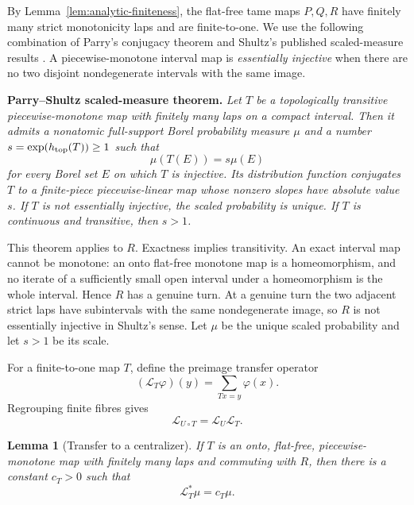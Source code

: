 \documentclass[11pt]{article}
\newtheorem{lemma}[theorem]{Lemma}
\theoremstyle{definition}
\theoremstyle{remark}
\begin{document}
By Lemma~\ref{lem:analytic-finiteness}, the flat-free tame maps
\(P,Q,R\) have finitely many strict monotonicity laps and are finite-to-one.
We use the following combination of Parry's conjugacy theorem
\cite{Parry} and Shultz's published scaled-measure results
\cite[Corollaries 4.4 and 4.6 and Proposition 3.6]{Shultz}.  A
piecewise-monotone interval map is
\emph{essentially injective} when there are no two disjoint nondegenerate
intervals with the same image.

\medskip
\noindent\textbf{Parry--Shultz scaled-measure theorem.}
\emph{Let $T$ be a topologically transitive piecewise-monotone map with
finitely many laps on a compact interval.  Then it admits a nonatomic
full-support Borel
probability measure $\mu$ and a number
$s=\exp(h_{\rm top}(T))\geq1$ such that
\[
 \mu(T(E))=s\mu(E)
\]
for every Borel set $E$ on which $T$ is injective.  Its distribution function
conjugates $T$ to a finite-piece piecewise-linear map whose nonzero slopes
have absolute value $s$.  If $T$ is not essentially injective, the scaled
probability is unique.  If $T$ is continuous and transitive, then $s>1$.}
\medskip

This theorem applies to $R$.  Exactness implies transitivity.  An exact
interval map cannot be monotone: an onto flat-free monotone map is a
homeomorphism, and
no iterate of a sufficiently small open interval under a homeomorphism is
the whole interval.  Hence $R$ has a genuine turn.  At a genuine turn the
two adjacent strict laps have subintervals with the same nondegenerate image,
so $R$ is not essentially injective in Shultz's sense.  Let $\mu$ be the
unique scaled probability and let $s>1$ be its scale.

For a finite-to-one map \(T\), define the preimage transfer operator
\[
 (\mathcal L_T\varphi)(y)=\sum_{Tx=y}\varphi(x).
\]
Regrouping finite fibres gives
\begin{equation}\label{eq:analytic-transfer-composition}
 \mathcal L_{U\circ T}=\mathcal L_U\mathcal L_T.
\end{equation}

\begin{lemma}[Transfer to a centralizer]\label{lem:analytic-transfer}
If \(T\) is an onto, flat-free, piecewise-monotone map with finitely many laps
and commuting with \(R\), then there is a constant \(c_T>0\) such that
\[
 \mathcal L_T^*\mu=c_T\mu.
\]
\end{lemma}
\end{document}
